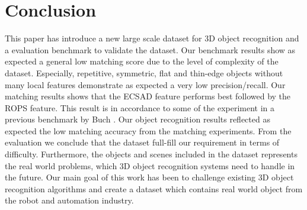 \documentclass[10pt,twocolumn,letterpaper]{article}
\begin{document}
\section{Conclusion}\label{sec:conclusion}
This paper has introduce a new large scale dataset for 3D object recognition and a evaluation benchmark to validate the dataset. Our benchmark results show as expected a general low matching score due to the level of complexity of the dataset. Especially, repetitive, symmetric, flat and thin-edge objects without many local features demonstrate as expected a very low precision/recall. Our matching results shows that the ECSAD feature performs best followed by the ROPS feature. This result is in accordance to some of the experiment in a previous benchmark by Buch \etal \cite{Buch2016}. Our object recognition results reflected as expected the low matching accuracy from the matching experiments. From the evaluation we conclude that the dataset full-fill our requirement in terms of difficulty. Furthermore, the objects and scenes included in the dataset represents the real world problems, which 3D object recognition systems need to handle in the future. Our main goal of this work has been to challenge existing 3D object recognition algorithms and create a dataset which contains real world object from the robot and automation industry.\\
\end{document}
